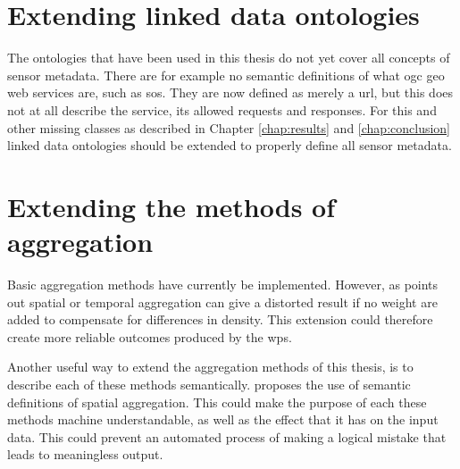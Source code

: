 \section*{Extending linked data ontologies}
The ontologies that have been used in this thesis do not yet cover all concepts of sensor metadata. There are for example no semantic definitions of what \ac{ogc} geo web services are, such as \ac{sos}. They are now defined as merely a \ac{url}, but this does not at all describe the service, its allowed requests and responses. For this and other missing classes as described in Chapter \ref{chap:results} and \ref{chap:conclusion} linked data ontologies should be extended to properly define all sensor metadata.   

\section*{Extending the methods of aggregation}
\label{par:FRaggregation}

Basic aggregation methods have currently be implemented. However, as \cite{SW:Ganesan} points out spatial or temporal aggregation can give a distorted result if no weight are added to compensate for differences in density. This extension could therefore create more reliable outcomes produced by the \ac{wps}. 

Another useful way to extend the aggregation methods of this thesis, is to describe each of these methods semantically. \cite{SSW:Stasch4} proposes the use of semantic definitions of spatial aggregation. This could make the purpose of each these methods machine understandable, as well as the effect that it has on the input data. This could prevent an automated process of making a logical mistake that leads to meaningless output. 
